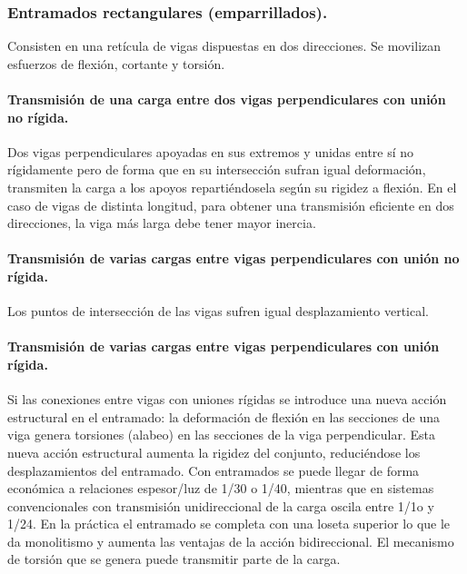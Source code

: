 \subsubsection{Entramados rectangulares (emparrillados).}
Consisten en una retícula de vigas dispuestas en dos direcciones. Se movilizan esfuerzos de flexión, cortante y torsión. 

\paragraph{Transmisión de una carga entre dos vigas perpendiculares con unión no rígida.}
Dos vigas perpendiculares apoyadas en sus extremos y unidas entre sí no rígidamente pero de forma que en su intersección sufran igual deformación, transmiten la carga a los apoyos repartiéndosela según su rigidez a flexión. En el caso de vigas de distinta longitud, para obtener una transmisión eficiente en dos direcciones, la viga más larga debe tener mayor inercia.

\paragraph{Transmisión de varias cargas entre vigas perpendiculares con unión no rígida.}
Los puntos de intersección de las vigas sufren igual desplazamiento vertical.

\paragraph{Transmisión de varias cargas entre vigas perpendiculares con unión rígida.}
Si las conexiones entre vigas con uniones rígidas se introduce una nueva acción estructural en el entramado: la deformación de flexión en las secciones de una viga genera torsiones (alabeo) en las secciones de la viga perpendicular. Esta nueva acción estructural aumenta la rigidez del conjunto, reduciéndose los desplazamientos del entramado. Con entramados se puede llegar de forma económica a relaciones espesor/luz de 1/30 o 1/40, mientras que en sistemas convencionales con transmisión unidireccional de la carga oscila entre 1/1o y 1/24. En la práctica el entramado se completa con una loseta superior lo que le da monolitismo y aumenta las ventajas de la acción bidireccional. El mecanismo de torsión que se genera puede transmitir parte de la carga.

